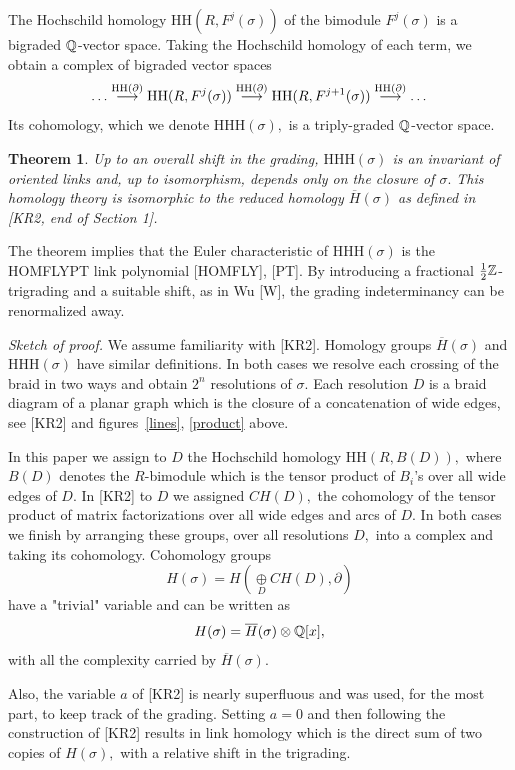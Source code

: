 \documentclass[12pt]{article}
\newtheorem{theorem}{Theorem}
\newcommand{\oplusop}[1]{{\mathop{\oplus}\limits_{#1}}}
\begin{document}
The Hochschild homology $\mathrm{HH}(R,F^j(\sigma))$ of 
the bimodule $F^j(\sigma)$ is 
a bigraded $\mathbb Q$-vector space. Taking the Hochschild homology of each term, we 
obtain a complex of bigraded vector spaces 
$$ \dots \stackrel{\mathrm{HH}(\partial)}{\longrightarrow} 
 \mathrm{HH}(R,F^j(\sigma)) \stackrel{\mathrm{HH}(\partial)}{\longrightarrow} 
\mathrm{HH}(R,F^{j+1}(\sigma)) \stackrel{\mathrm{HH}(\partial)}{\longrightarrow} \dots $$ 
Its cohomology, which we denote $\mathrm{HHH}(\sigma),$ is a 
triply-graded $\mathbb Q$-vector space. 

\begin{theorem} \label{thm} Up to an overall shift in the grading, 
$\mathrm{HHH}(\sigma)$ is an invariant of oriented links 
and, up to isomorphism, depends only on the closure of $\sigma.$ This homology 
theory is isomorphic to the reduced homology $\overline{H}(\sigma)$ 
as defined in [KR2, end of Section 1]. 
\end{theorem} 

The theorem implies that the Euler characteristic of 
$\mathrm{HHH}(\sigma)$ is the HOMFLYPT link polynomial 
[HOMFLY], [PT]. By introducing a fractional 
$\frac{1}{2}\mathbb Z$-trigrading and a suitable shift, as in Wu [W], 
the grading indeterminancy can be renormalized away. 

\vspace{0.1in} 

\emph{Sketch of proof.} We assume familiarity with [KR2]. Homology 
groups $\overline{H}(\sigma)$ and $\mathrm{HHH}(\sigma)$ 
have similar definitions. In both cases we resolve each crossing 
of the braid in two ways and obtain $2^n$ resolutions of $\sigma.$ 
Each resolution $D$ is a braid diagram of a planar 
graph which is the closure of a concatenation of wide edges, see 
[KR2] and figures~\ref{lines}, \ref{product} above. 

In this paper we assign to $D$ the Hochschild homology $\mathrm{HH}(R,B(D)),$ 
where $B(D)$ denotes the $R$-bimodule which is the tensor 
product of $B_i$'s over all wide edges of $D.$ In [KR2] to $D$ 
we assigned $CH(D),$ the cohomology of the tensor product of 
matrix factorizations over all wide edges and arcs of $D.$ 
In both cases we finish by arranging these groups, over all 
resolutions $D,$ into a complex and taking its cohomology.
Cohomology groups 
$$H(\sigma) = H(\oplusop{D} CH(D), \partial)$$ 
have a "trivial" variable and can be written as  
$$H(\sigma)= \overline{H}(\sigma) \otimes \mathbb Q[x],$$ 
with all the complexity carried by $\overline{H}(\sigma).$

Also, the variable $a$ of [KR2] is nearly superfluous and was used, for the 
most part, to keep track of the grading. Setting $a=0$ 
and then following the construction of [KR2] results in 
link homology which is the direct sum of two copies of $H(\sigma),$ 
with a relative shift in the trigrading. 
\end{document}
